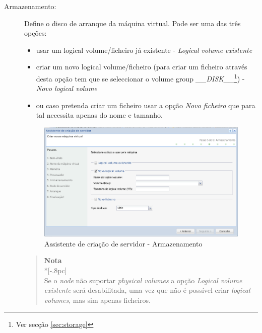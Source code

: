 \begin{description}
	\item[Armazenamento:] Define o disco de arranque da máquina virtual. Pode ser uma das três opções:
\begin{itemize}
	\item usar um logical volume/ficheiro já existente - \emph{Logical volume existente}
	\item criar um novo logical volume/ficheiro (para criar um ficheiro através desta opção tem que se seleccionar o volume group \emph{\_\_DISK\_\_}\footnote{Ver secção \ref{sec:storage}}) - \emph{Novo logical volume}
	\item  ou caso pretenda criar um ficheiro usar a opção \emph{Novo ficheiro} que para tal necessita apenas do nome e tamanho.
\end{itemize}

        \begin{figure}[H]
        		\begin{center}
	        	\includegraphics[scale=0.5]{screenshots/server_createwiz_storage.png}
	        	\caption{Assistente de criação de servidor - Armazenamento}
		        \label{fig:server_createwiz_storage}
        		\end{center}
		\end{figure}

		\begin{quote}
			{\large \bf Nota} \\*[-.8pc]
			\underline{\hspace{6in}} \\
			Se o \emph{node} não suportar \emph{physical volumes} a opção \emph{Logical volume existente} será desabilitada, uma vez que não é possível criar \emph{logical volumes}, mas sim apenas ficheiros.
		\end{quote}		
        

\end{description}
